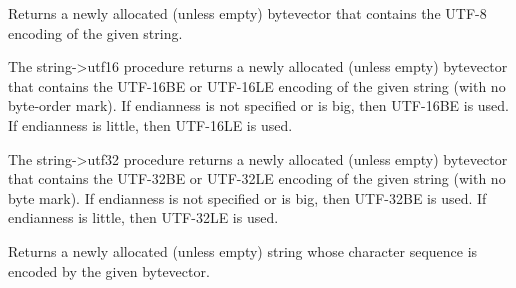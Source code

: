 \begin{entry}{%
}

Returns a newly allocated (unless empty) bytevector that
contains the UTF-8 encoding of the given string.
\end{entry}

\begin{entry}{%
}

  The {\cf string->utf16}
  procedure returns a newly allocated (unless empty) bytevector that
contains the UTF-16BE or UTF-16LE encoding of the given string (with
no byte-order mark).  If endianness is not specified or is {\cf big},
then UTF-16BE is used.  If endianness is {\cf little}, then UTF-16LE
is used.
\end{entry}

\begin{entry}{%
}

  The {\cf string->utf32}
procedure returns
a newly allocated (unless empty) bytevector that contains the UTF-32BE
or UTF-32LE encoding of the given string (with no byte mark).  If
endianness is not specified or is {\cf big}, then UTF-32BE is used.
If endianness is {\cf little}, then UTF-32LE is used.
\end{entry}

\begin{entry}{%
}

Returns a newly allocated (unless empty) string whose character
sequence is encoded by the given bytevector.
\end{entry}

